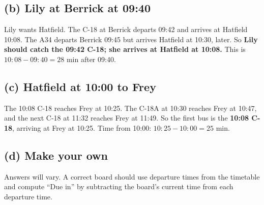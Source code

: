 \documentclass[11pt,a4paper]{article}
\newcommand{\ans}[1]{\textcolor{red!75!black}{\textbf{#1}}}
\begin{document}
\subsection*{(b) Lily at Berrick at 09:40}
Lily wants Hatfield. The C-18 at Berrick departs 09:42 and arrives at Hatfield 10:08. The A34 departs Berrick 09:45 but arrives Hatfield at 10:30, later. So \ans{Lily should catch the 09:42 C-18; she arrives at Hatfield at 10:08.} This is \(10{:}08-09{:}40=28\) min after 09:40.

\subsection*{(c) Hatfield at 10:00 to Frey}
The 10:08 C-18 reaches Frey at 10:25. The C-18A at 10:30 reaches Frey at 10:47, and the next C-18 at 11:32 reaches Frey at 11:49. So the first bus is the \ans{10:08 C-18}, arriving at Frey at 10:25. Time from 10:00: \(10{:}25-10{:}00=25\) min.

\subsection*{(d) Make your own}
Answers will vary. A correct board should use departure times from the timetable and compute ``Due in'' by subtracting the board's current time from each departure time.
\end{document}
